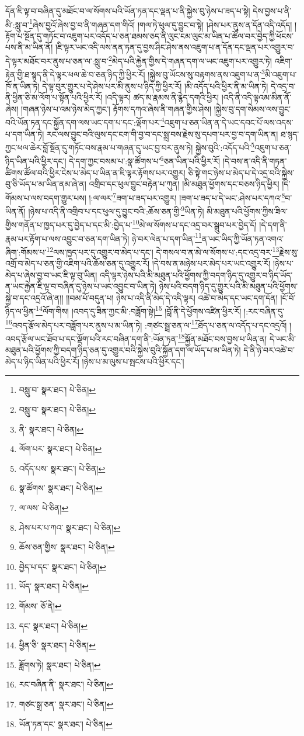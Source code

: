 དོན་ཇི་ལྟ་བ་བཞིན་དུ་མཐོང་བ་ལ་སོགས་པའི་ཡོན་ཏན་དང་ལྡན་པ་ནི་སྐྱེས་བུ་ཉེས་པ་ཟད་པ་སྟེ། དེས་བྱས་པ་ནི་མི་:སླུ་བ་\footnote{བསླུ་བ་  སྣར་ཐང་།  པེ་ཅིན། }ཞེས་བྱའོ་ཞེས་བྱ་བ་ནི་གཞན་དག་གིའོ། །གལ་ཏེ་ཕུལ་དུ་བྱུང་བ་སྟེ། །ཤེས་པར་ནུས་ན་དོན་འདི་འདོད། །རྟོག་པ་སྔོན་དུ་གཏོང་བ་འཇུག་པར་འདོད་པ་ཅན་ཐམས་ཅད་ནི་ལུང་ངམ་ལུང་མ་ཡིན་པ་ཚོལ་བར་བྱེད་ཀྱི་ཕོངས་པས་ནི་མ་ཡིན་ནོ། །ཇི་ལྟར་ཡང་འདི་ལས་ནན་ཏན་དུ་བྱས་ཤིང་ཤེས་ནས་འཇུག་པ་ན་དོན་དང་ལྡན་པར་འགྱུར་བ་དེ་ལྟར་མཐོང་བར་ནུས་པ་ཅན་ལ་:སླུ་བ་\footnote{བསླུ་བ་  སྣར་ཐང་།  པེ་ཅིན། }མེད་པའི་རྐྱེན་གྱིས་དེ་གཞན་དག་ལ་ཡང་འཇུག་པར་འགྱུར་ཏེ། འཇིག་རྟེན་གྱི་ཐ་སྙད་ནི་དེ་ལྟར་ཕལ་ཆེ་བ་ཅན་ཉིད་ཀྱི་ཕྱིར་རོ། །སྐྱེས་བུ་ཡོངས་སུ་བརྟགས་ནས་འཇུག་པ་ན་\footnote{ནི་  སྣར་ཐང་།  པེ་ཅིན། }མི་འཇུག་པ་ཁོ་ན་ཡིན་ཏེ། དེ་ལྟ་བུར་གྱུར་པ་དེ་ཤེས་པར་མི་ནུས་པ་ཉིད་ཀྱི་ཕྱིར་རོ། །མི་འདོད་པའི་ཕྱིར་ནི་མ་ཡིན་ཏེ། དེ་འདྲ་བ་ནི་ཕྱིན་ཅི་མ་ལོག་པ་སྟོན་པའི་ཕྱིར་རོ། །འདི་ལྟར། ཚད་མ་རྣམས་ནི་རྙེད་དགའི་ཕྱིར། །འདི་ནི་འདི་ལྟའམ་མིན་ནོ་ཞེས། །གཞན་ཉེས་པ་འམ་ཉེས་མེད་ཀྱང་། རྟོགས་དཀའ་ཞེས་ནི་གཞན་གྱིས་ཤེས། །སྐྱེས་བུ་དག་སེམས་ལས་བྱུང་བའི་ཡོན་ཏན་དང་སྐྱོན་དག་ལས་ཡང་དག་པ་དང་:ལྡོག་པར་\footnote{ལོག་པར་  སྣར་ཐང་།  པེ་ཅིན། }འཇུག་པ་ཅན་ཡིན་ན་དེ་ཡང་དབང་པོ་ལས་འདས་པ་དག་ཡིན་ཏེ། རང་ལས་བྱུང་བའི་ལུས་དང་ངག་གི་བྱ་བ་དང་སྨྲ་བས་རྗེས་སུ་དཔག་པར་བྱ་བ་དག་ཡིན་ན། ཐ་སྙད་ཀྱང་ཕལ་ཆེར་བློ་སྔོན་དུ་གཏོང་བས་རྣམ་པ་གཞན་དུ་ཡང་བྱ་བར་ནུས་ཏེ། སྐྱེས་བུའི་:འདོད་པའི་\footnote{འདོད་པས་  སྣར་ཐང་།  པེ་ཅིན། }འཇུག་པ་ཅན་ཉིད་ཡིན་པའི་ཕྱིར་དང་། དེ་དག་ཀྱང་བསམ་པ་:སྣ་ཚོགས་པ་\footnote{སྣ་ཚོགས་  སྣར་ཐང་།  པེ་ཅིན། }ཅན་ཡིན་པའི་ཕྱིར་རོ། །དེ་བས་ན་འདི་ནི་གཏན་ཚིགས་ཚོལ་བའི་ཕྱིར་ངེས་པ་མེད་པ་ཡིན་ན་ཇི་ལྟར་རྟོགས་པར་འགྱུར། ཅི་སྟེ་གང་ཉེས་པ་མེད་པ་དེ་འདྲ་བའི་སྐྱེས་བུ་ཅི་ཡོད་པ་མ་ཡིན་ནམ་ཞེ་ན། འགྲིབ་དང་ཕུལ་བྱུང་བརྟེན་པ་ཀུན། །མི་མཐུན་ཕྱོགས་དང་བཅས་ཉིད་ཕྱིར། །དེ་གོམས་པ་ལས་བདག་གྱུར་པས། །:ལ་ལར་\footnote{ལ་ལས་  པེ་ཅིན། }ཟག་པ་ཟད་པར་འགྱུར། །ཟག་པ་ཟད་པ་དེ་ཡང་:ཤེས་པར་དཀའ་\footnote{ཤེས་པར་པ་ཀའ་  སྣར་ཐང་།  པེ་ཅིན། }བ་ཡིན་ནོ། །ཉེས་པ་འདི་ནི་འགྲིབ་པ་དང་ཕུལ་དུ་བྱུང་བའི་:ཆོས་ཅན་གྱི་\footnote{ཆོས་ཅན་གྱིས་  སྣར་ཐང་།  པེ་ཅིན། }ཡིན་ཏེ། མི་མཐུན་པའི་ཕྱོགས་ཀྱིས་ཟིལ་གྱིས་གནོན་པ་ཁྱད་པར་དུ་བྱེད་པ་དང་མི་:བྱེད་པ་\footnote{བྱེད་པ་དང་  སྣར་ཐང་།  པེ་ཅིན། }མེ་ལ་སོགས་པ་དང་འདྲ་བར་སྒྲུབ་པར་བྱེད་དོ། །དེ་དག་ནི་རྣམ་པར་རྟོག་པ་ལས་འབྱུང་བ་ཅན་དག་ཡིན་ཏེ། ཉེ་བར་ལེན་པ་དག་ཡིན་\footnote{ཡོད་  སྣར་ཐང་།  པེ་ཅིན། }ན་ཡང་ཡིད་ཀྱི་ཡོན་ཏན་འགའ་ཞིག་:གོམས་པ་\footnote{གོམས་  ཅོ་ནེ། }ལས་ཁྱད་པར་དུ་འགྱུར་བ་མེད་པ་དང་། དེ་གསལ་བ་ན་མེ་ལ་སོགས་པ་:དང་འདྲ་བར་\footnote{དང་  སྣར་ཐང་།  པེ་ཅིན། }རྗེས་སུ་འགྲོ་བ་མེད་པ་ཅན་གྱི་འཇིག་པའི་ཆོས་ཅན་དུ་འགྱུར་རོ། །དེ་བས་ན་མཉེས་པར་མེད་པར་ཡང་འགྱུར་རོ། །ཉེས་པ་མེད་པ་ཞེས་བྱ་བ་ཡང་ཇི་ལྟ་བུ་ཡིན། འདི་ལྟར་ཉེས་པའི་མི་མཐུན་པའི་ཕྱོགས་ཀྱི་བདག་ཉིད་དུ་འགྱུར་བ་ཉིད་ཡོད་ན་ཡང་རྐྱེན་ཇི་ལྟ་བ་བཞིན་དུ་ཉེས་པ་ཡང་འབྱུང་བ་ཡིན་ཏེ། ཉེས་པའི་བདག་ཉིད་དུ་གྱུར་པའི་མི་མཐུན་པའི་ཕྱོགས་སྐྱེ་བ་དང་འདྲའོ་ཞེ་ན།། །།བམ་པོ་བདུན་པ། ཉེས་པ་འདི་ནི་མེད་དེ་འདི་ལྟར། འཚེ་བ་མེད་དང་ཡང་དག་དོན། །ངོ་བོ་ཉིད་ལ་ཕྱིན་\footnote{ཕྱིན་ཅི་  སྣར་ཐང་།  པེ་ཅིན། }ལོག་གིས། །འབད་དུ་ཟིན་ཀྱང་མི་:བཟློག་སྟེ།\footnote{ཟློགས་ཏེ།  སྣར་ཐང་།  པེ་ཅིན། } །བློ་ནི་དེ་ཕྱོགས་འཛིན་ཕྱིར་རོ། །:རང་བཞིན་དུ་\footnote{རང་བཞིན་ནི་  སྣར་ཐང་།  པེ་ཅིན། }འབད་རྩོལ་མེད་པར་བཟློག་པར་ནུས་པ་མ་ཡིན་ཏེ། :གཙང་སྦྲ་ཅན་ལ་\footnote{གཙང་སྒྲ་ཅན་  སྣར་ཐང་།  པེ་ཅིན། }ཐོད་པ་ཅན་ལ་འདོད་པ་དང་འདྲའོ། །འབད་རྩོལ་ཡང་ཐོབ་པ་དང་ལྡོག་པའི་རང་བཞིན་དག་ནི་:ཡོན་ཏན་\footnote{ཡོན་ཏན་དང་  སྣར་ཐང་།  པེ་ཅིན། }སྐྱོན་མཐོང་བས་བྱས་པ་ཡིན་ན། དེ་ཡང་མི་མཐུན་པའི་ཕྱོགས་ཀྱི་བདག་ཉིད་ཅན་དུ་འགྱུར་བའི་སྐྱེས་བུའི་སྐྱོན་དག་ལ་ཡོད་པ་མ་ཡིན་ཏེ། དེ་ནི་ཉེ་བར་འཚེ་བ་མེད་པ་ཉིད་ཡིན་པའི་ཕྱིར་རོ། །ཉེས་པ་མ་ལུས་པ་སྤངས་པའི་ཕྱིར་དང་། 